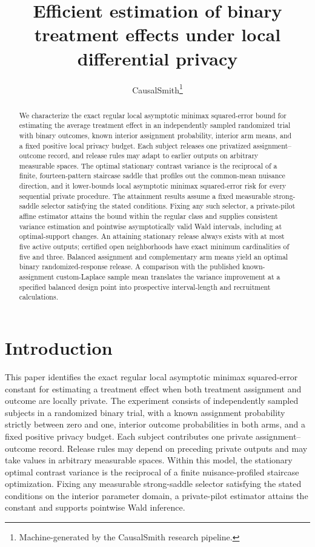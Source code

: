 \documentclass[11pt]{article}
\title{Efficient estimation of binary treatment effects under local differential privacy}
\author{CausalSmith\thanks{Machine-generated by the CausalSmith research pipeline.}}
\date{\cspaperdate}
\begin{document}
\maketitle

\begin{abstract}
We characterize the exact regular local asymptotic minimax squared-error bound for estimating the average treatment effect in an independently sampled randomized trial with binary outcomes, known interior assignment probability, interior arm means, and a fixed positive local privacy budget. Each subject releases one privatized assignment--outcome record, and release rules may adapt to earlier outputs on arbitrary measurable spaces. The optimal stationary contrast variance is the reciprocal of a finite, fourteen-pattern staircase saddle that profiles out the common-mean nuisance direction, and it lower-bounds local asymptotic minimax squared-error risk for every sequential private procedure. The attainment results assume a fixed measurable strong-saddle selector satisfying the stated conditions. Fixing any such selector, a private-pilot affine estimator attains the bound within the regular class and supplies consistent variance estimation and pointwise asymptotically valid Wald intervals, including at optimal-support changes. An attaining stationary release always exists with at most five active outputs; certified open neighborhoods have exact minimum cardinalities of five and three. Balanced assignment and complementary arm means yield an optimal binary randomized-response release. A comparison with the published known-assignment custom-Laplace sample mean translates the variance improvement at a specified balanced design point into prospective interval-length and recruitment calculations.
\end{abstract}

\section{Introduction}

This paper identifies the exact regular local asymptotic minimax squared-error constant for estimating a treatment effect when both treatment assignment and outcome are locally private. The experiment consists of independently sampled subjects in a randomized binary trial, with a known assignment probability strictly between zero and one, interior outcome probabilities in both arms, and a fixed positive privacy budget. Each subject contributes one private assignment--outcome record. Release rules may depend on preceding private outputs and may take values in arbitrary measurable spaces. Within this model, the stationary optimal contrast variance is the reciprocal of a finite nuisance-profiled staircase optimization. Fixing any measurable strong-saddle selector satisfying the stated conditions on the interior parameter domain, a private-pilot estimator attains the constant and supports pointwise Wald inference.
\end{document}
